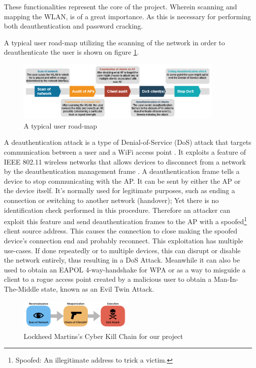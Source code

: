 These functionalities represent the core of the project. Wherein scanning and mapping the WLAN, is of a great importance. As this is necessary for performing both deauthentication and password cracking. 

A typical user road-map utilizing the scanning of the network in order to deauthenticate the user is shown on figure \ref{user-roadmap}.  

\begin{figure}[!htbp]
    \centering
    \includegraphics[width=0.9\textwidth]{Latex-Files/Billeder/Flowcharts/user-roadmap.png}
    \caption{A typical user road-map}
    \label{user-roadmap}
\end{figure}

A deauthentication attack is a type of Denial-of-Service (DoS) attack that targets communication between a user and a WiFi access point \cite{Deauth}. It exploits a feature of IEEE 802.11 wireless networks that allows devices to disconnect from a network by the deauthentication management frame \cite{Deauth_Wiki}.
A deauthentication frame tells a device to stop communicating with the AP. It can be sent by either the AP or the device itself. It's normally used for legitimate purposes, such as ending a connection or switching to another network (handover); Yet there is no identification check performed in this procedure. Therefore an attacker can exploit this feature and send deauthentication frames to the AP with a spoofed\footnote{Spoofed: An illegitimate address to trick a victim.} client source address. This causes the connection to close making the spoofed device's connection end and probably reconnect. This exploitation has multiple use-cases. If done repeatedly or to multiple devices, this can disrupt or disable the network entirely, thus resulting in a DoS Attack. Meanwhile it can also be used to obtain an EAPOL 4-way-handshake for WPA or as a way to misguide a client to a rogue access point created by a malicious user to obtain a Man-In-The-Middle state, known as an Evil Twin Attack. 

\begin{figure}[!htbp]
    \centering
    \includegraphics[width=0.5\textwidth]{Latex-Files/Billeder/Lockheed Martin.png}
    \caption{Lockheed Martins's Cyber Kill Chain for our project}
    \label{kill-chain}
\end{figure}


